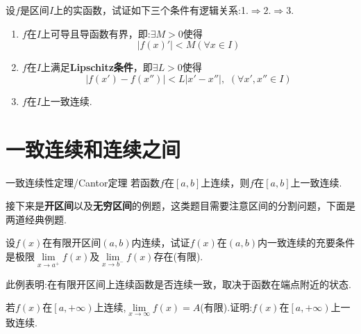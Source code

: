 \begin{example}
	设$f$是区间$I$上的实函数，试证如下三个条件有逻辑关系:1.$ \Rightarrow 2. \Rightarrow 3.$
	\begin{enumerate}
		\item $f$在$I$上可导且导函数有界，即:$\exists M>0$使得$$\left| f\left( x \right) ' \right|<M\left( \forall x\in I \right) $$
		\item $f$在$I$上满足\textbf{Lipschitz条件}，即$\exists L>0$使得
		      $$
			      \left| f\left( x' \right) -f\left( x'' \right) \right|<L\left| x'-x'' \right|,\,\,\left( \forall \right. x',x''\in \left. I \right)
		      $$
		\item $f$在$I$上一致连续.
	\end{enumerate}
\end{example}

\vspace*{6cm}

\section{一致连续和连续之间}

\begin{theorem}{一致连续性定理/Cantor定理}
	若函数$f$在$\left[ a,b \right] $上连续，则$f$在$\left[ a,b \right] $上一致连续.
\end{theorem}

接下来是\textbf{开区间}以及\textbf{无穷区间}的例题，这类题目需要注意区间的分割问题，下面是两道经典例题.

\begin{example}
	设$f\left( x \right) $在有限开区间$\left( a,b \right) $内连续，试证$f\left( x \right) $在$\left( a,b \right) $内一致连续的充要条件是极限$\lim\limits_{x\rightarrow a^+}f\left( x \right) $及$\lim\limits_{x\rightarrow b^-}f\left( x \right) $存在(有限).
\end{example}

\begin{note}
	此例表明:在有限开区间上连续函数是否连续一致，取决于函数在端点附近的状态.
\end{note}

\vspace{8cm}

\begin{example}
	若$f\left( x \right) $在$\left[ a,+\left. \infty \right) \right. $上连续,$\lim\limits_{x\rightarrow \infty}f\left( x \right) =A$(有限).证明:$f\left( x \right) $在$\left[ a,+\left. \infty \right) \right. $上一致连续.
\end{example}

